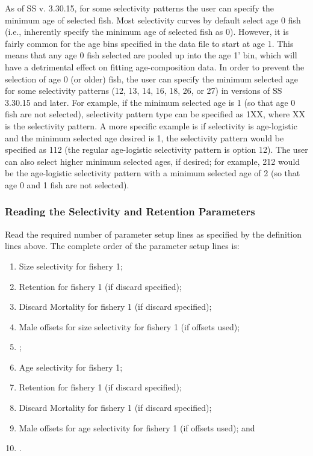 As of SS v. 3.30.15, for some selectivity patterns the user can specify the minimum age of selected fish. Most selectivity curves by default select age 0 fish (i.e., inherently specify the minimum age of selected fish as 0). However, it is fairly common for the age bins specified in the data file to start at age 1. This means that any age 0 fish selected are pooled up into the age 1' bin, which will have a detrimental effect on fitting age-composition data. In order to prevent the selection of age 0 (or older) fish, the user can specify the minimum selected age for some selectivity patterns (12, 13, 14, 16, 18, 26, or 27) in versions of SS 3.30.15 and later. For example, if the minimum selected age is 1 (so that age 0 fish are not selected), selectivity pattern type can be specified as 1XX, where XX is the selectivity pattern. A more specific example is if selectivity is age-logistic and the minimum selected age desired is 1, the selectivity pattern would be specified as 112 (the regular age-logistic selectivity pattern is option 12). The user can also select higher minimum selected ages, if desired; for example, 212 would be the age-logistic selectivity pattern with a minimum selected age of 2 (so that age 0 and 1 fish are not selected).

\subsubsection{Reading the Selectivity and Retention Parameters}
Read the required number of parameter setup lines as specified by the definition lines above.  The complete order of the parameter setup lines is:
\begin{enumerate}
	\item Size selectivity for fishery 1;
	\item Retention for fishery 1 (if discard specified);
	\item Discard Mortality for fishery 1 (if discard specified);
	\item Male offsets for size selectivity for fishery 1 (if offsets used);
	\item <repeat for additional fleets and surveys>;
	\item Age selectivity for fishery 1;
	\item Retention for fishery 1 (if discard specified);
	\item Discard Mortality for fishery 1 (if discard specified);
	\item Male offsets for age selectivity for fishery 1 (if offsets used); and
	\item <repeat for additional fleets and surveys>.
\end{enumerate}


